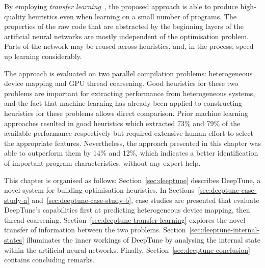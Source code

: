 By employing \emph{transfer learning}~\cite{Yosinski2014}, the proposed approach is able to produce high-quality heuristics even when learning on a small number of programs. The properties of the raw code that are abstracted by the beginning layers of the artificial neural networks are mostly independent of the optimisation problem. Parts of the network may be reused across heuristics, and, in the process, speed up learning considerably.

The approach is evaluated on two parallel compilation problems: heterogeneous device mapping and GPU thread coarsening. Good heuristics for these two problems are important for extracting performance from heterogeneous systems, and the fact that machine learning has already been applied to constructing heuristics for these problems allows direct comparison. Prior machine learning approaches resulted in good heuristics which extracted 73\% and 79\% of the available performance respectively but required extensive human effort to select the appropriate features. Nevertheless, the approach presented in this chapter was able to outperform them by 14\% and 12\%, which indicates a better identification of important program characteristics, without any expert help.

This chapter is organised as follows: Section~\ref{sec:deeptune} describes DeepTune, a novel system for building optimisation heuristics. In Sections~\ref{sec:deeptune-case-study-a} and~\ref{sec:deeptune-case-study-b}, case studies are presented that evaluate DeepTune's capabilities first at predicting heterogeneous device mapping, then thread coarsening. Section~\ref{sec:deeptune-transfer-learning} explores the novel transfer of information between the two problems. Section~\ref{sec:deeptune-internal-states} illuminates the inner workings of DeepTune by analysing the internal state within the artificial neural networks. Finally, Section~\ref{sec:deeptune-conclusion} contains concluding remarks.
